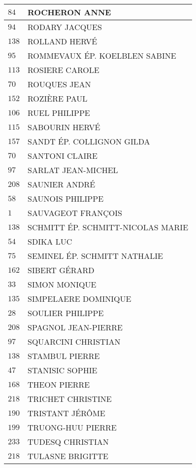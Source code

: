 \begin{xltabular}{\linewidth}{|l|X|}
    \hline
    $84$ & ROCHERON ANNE \\
    \hline
    $94$ & RODARY JACQUES \\
    \hline
    $138$ & ROLLAND HERVÉ \\
    \hline
    $95$ & ROMMEVAUX ÉP. KOELBLEN SABINE \\
    \hline
    $113$ & ROSIERE CAROLE \\
    \hline
    $70$ & ROUQUES JEAN \\
    \hline
    $152$ & ROZIÈRE PAUL \\
    \hline
    $106$ & RUEL PHILIPPE \\
    \hline
    $115$ & SABOURIN HERVÉ \\
    \hline
    $157$ & SANDT ÉP. COLLIGNON GILDA \\
    \hline
    $70$ & SANTONI CLAIRE \\
    \hline
    $97$ & SARLAT JEAN-MICHEL \\
    \hline
    $208$ & SAUNIER ANDRÉ \\
    \hline
    $58$ & SAUNOIS PHILIPPE \\
    \hline
    $1$ & SAUVAGEOT FRANÇOIS \\
    \hline
    $138$ & SCHMITT ÉP. SCHMITT-NICOLAS MARIE \\
    \hline
    $54$ & SDIKA LUC \\
    \hline
    $75$ & SEMINEL ÉP. SCHMITT NATHALIE \\
    \hline
    $162$ & SIBERT GÉRARD \\
    \hline
    $33$ & SIMON MONIQUE \\
    \hline
    $135$ & SIMPELAERE DOMINIQUE \\
    \hline
    $28$ & SOULIER PHILIPPE \\
    \hline
    $208$ & SPAGNOL JEAN-PIERRE \\
    \hline
    $97$ & SQUARCINI CHRISTIAN \\
    \hline
    $138$ & STAMBUL PIERRE \\
    \hline
    $47$ & STANISIC SOPHIE \\
    \hline
    $168$ & THEON PIERRE \\
    \hline
    $218$ & TRICHET CHRISTINE \\
    \hline
    $190$ & TRISTANT JÉRÔME \\
    \hline
    $199$ & TRUONG-HUU PIERRE \\
    \hline
    $233$ & TUDESQ CHRISTIAN \\
    \hline
    $218$ & TULASNE BRIGITTE \\

\end{xltabular}
